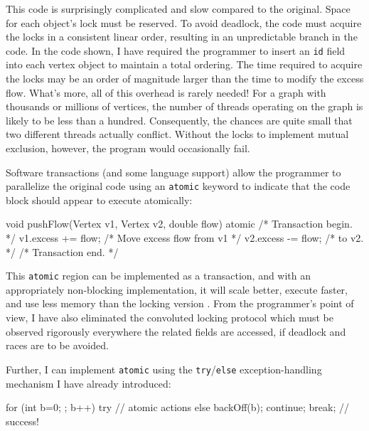 This code is surprisingly complicated and slow compared to the
original.  Space for each object's lock must be reserved.
To avoid deadlock, the code must acquire the locks in
a consistent linear order, resulting in an unpredictable branch in the
code.  In the code shown,
I have required the programmer to insert an \texttt{id} field into
each vertex object to maintain a total ordering.
The time required to acquire the locks may be
an order of magnitude larger than the time to
modify the excess flow.
What's more, all of this overhead is rarely
needed!  For a graph with thousands or millions of vertices, the
number of threads operating on the graph is likely to be less than a
hundred.  Consequently, the chances are quite small that two different
threads actually conflict.  Without the locks to implement mutual
exclusion, however, the program would occasionally fail.

Software transactions (and some language support) allow the
programmer to parallelize the original code using an \texttt{atomic}
keyword to indicate that the code block should appear to execute
atomically: 
\begin{inlinecode}
void pushFlow(Vertex v1, Vertex v2, double flow) {
  atomic { /* Transaction begin. */
    v1.excess += flow; /* Move excess flow from v1 */
    v2.excess -= flow; /* to v2.                   */
  } /* Transaction end. */
}
\end{inlinecode}

This {\tt atomic} region can be implemented as a transaction, and
with an appropriately non-blocking implementation, it
will scale better, execute faster, and use less memory than the locking version
\cite{AnanianAsKuLeLi05,HarrisFr03,GreenwaldCh96,MassalinPu91,HerlihyMo93,ShavitTo95}.
From the programmer's point of view, I have also eliminated the
convoluted locking protocol which must
be observed rigorously everywhere the related fields are accessed, if
deadlock and races are to be avoided.

Further, I can implement {\tt atomic} using the {\tt try}/{\tt else}
exception-handling mechanism I have already introduced:
\begin{inlinecode}
for (int b=0; ; b++) {
  try {
    // atomic actions
  } else {
    backOff(b);
    continue;
  }
  break; // success!
}
\end{inlinecode}

